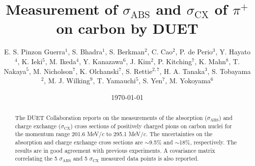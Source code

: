 \documentclass[%
 reprint,
showpacs,
 amsmath,amssymb,
 aps,
 prc,
]{revtex4-1}
\begin{document}
\title{Measurement of $\sigma_{\mathrm{ABS}}$ and $\sigma_{\mathrm{CX}}$ of $\pi^+$ on carbon by DUET}%

\author{E. S. Pinzon Guerra$^1$, S. Bhadra$^1$, S. Berkman$^2$, C. Cao$^2$, P. de Perio$^3$, Y. Hayato$^4$, K. Ieki$^5$, M. Ikeda$^4$, Y. Kanazawa$^6$,  J. Kim$^2$, P. Kitching$^7$, K. Mahn$^8$, T. Nakaya$^5$,  M. Nicholson$^7$, K. Olchanski$^7$, S. Rettie$^{2,7}$, H. A. Tanaka$^3$, S. Tobayama$^2$, M. J. Wilking$^9$, T. Yamauchi$^5$, S. Yen$^7$, M. Yokoyama$^6$}

%


\date{\today}%

\begin{abstract}

The DUET Collaboration reports on the measurements of the absorption ($\sigma_{\mathrm{ABS}}$) and charge exchange ($\sigma_{\mathrm{CX}}$) cross sections of positively charged pions on carbon nuclei for the momentum range 201.6 MeV$/c$ to 295.1 MeV$/c$. The uncertainties on the absorption and charge exchange cross sections are $\sim$9.5\% and $\sim$18\%, respectively. The results are in good agreement with previous experiments. A covariance matrix correlating the 5 $\sigma_{\mathrm{ABS}}$ and 5 $\sigma_{\mathrm{CX}}$ measured data points is also reported.

\end{abstract}
\end{document}
